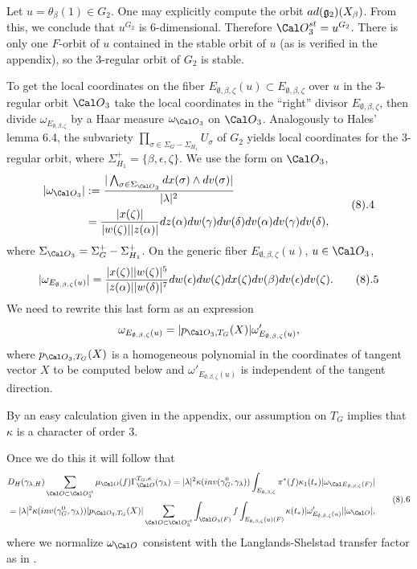 Let $u=\theta_{\beta}(1)\in G_2$.
One may explicitly compute the orbit $ad({\frak g}_2)(X_\beta)$.
From this, we conclude that $u^{G_2}$
is 6-dimensional. Therefore ${\Cal O}_3^{st}=u^{G_2}$. 
There is only one $F$-orbit of $u$ contained in the stable orbit of $u$
(as is verified in the appendix), so the $3$-regular orbit
of $G_2$ is stable.
\par
To get the local coordinates on the fiber 
$E_{\emptyset,\beta,\zeta}(u)\subset E_{\emptyset,\beta,\zeta}$ over
$u$ in the 3-regular orbit ${\Cal O}_3$ take the local
coordinates in the ``right'' divisor $E_{\emptyset,\beta,\zeta}$, 
then divide $\omega_{E_{\emptyset,\beta,\zeta}}$ by a Haar measure
$\omega_{{\Cal O}_3}$ on ${\Cal O}_3$.
Analogously to Hales' lemma 6.4,
the subvariety $\prod_{\sigma\in \Sigma_G-\Sigma_{H_1}}U_\sigma$
of $G_2$ yields local coordinates for the $3$-regular orbit,
where $\Sigma_{H_1}^+=\{\beta,\epsilon,\zeta\}$.
We use the form on ${\Cal O}_3$,
$$
\split
|\omega_{{\Cal O}_3}|
&:={|\bigwedge_{\sigma\in \Sigma_{{\Cal O}_3}}dx(\sigma)\wedge dv(\sigma)|
\over |\lambda|^2}\\
&={|x(\zeta)|\over |w(\zeta)||z(\alpha)|}
dz(\alpha)dw(\gamma)dw(\delta)dv(\alpha)dv(\gamma)dv(\delta),
\endsplit
\tag 8.4
$$
where $\Sigma_{{\Cal O}_3}=\Sigma_{G}^+ -\Sigma_{H_1}^+$.
On the generic fiber $E_{\emptyset,\beta,\zeta}(u)$, $u\in {\Cal O}_3$,
$$
|\omega_{E_{\emptyset,\beta,\zeta}(u)}|=
{{|x(\zeta)||w(\zeta)|^5}\over{|z(\alpha)||w(\delta)|^7}}
dw(\epsilon)dw(\zeta)dx(\zeta)dv(\beta)dv(\epsilon)dv(\zeta). 
\tag 8.5
$$
We need to rewrite this last form as an expression
$$
\omega_{E_{\emptyset,\beta,\zeta}(u)}=
|p_{{\Cal O}_3,T_G}(X)|\omega'_{E_{\emptyset,\beta,\zeta}(u)},
$$
where $p_{{\Cal O}_3,T_G}(X)$ is a homogeneous polynomial in the coordinates
of tangent vector $X$ to be computed below
and $\omega'_{E_{\emptyset,\beta,\zeta}(u)}$
is independent of the tangent direction. 
\par
By an easy calculation given in the appendix,
our assumption on $T_G$ implies that $\kappa$ is a character
of order $3$.
\par
Once we do this it will follow that
$$
\split
&D_H(\gamma_{\lambda,H})\sum_{{\Cal O}\subset {\Cal O}_3^{st}}
\mu_{\Cal O}(f)\Gamma_{\Cal O}^{T_G,\kappa}(\gamma_\lambda)
=|\lambda|^2\kappa(inv(\gamma_G^0,\gamma_\lambda))
\int_{E_{\emptyset,\beta,\zeta}}
\pi^*(f)\kappa_1(t_*)|\omega_{{\Cal E}_{\emptyset,\beta,\zeta}(F)}|\\
&=|\lambda|^2\kappa(inv(\gamma_G^0,\gamma_\lambda))
|p_{{\Cal O}_3,T_G}(X)|
\sum_{{\Cal O}\subset {\Cal O}_3^{st}}\int_{{\Cal O}_3(F)}f
\int_{E_{\emptyset,\beta,\zeta}(u)(F)}\kappa(t_*)
|\omega'_{E_{\emptyset,\beta,\zeta}(u)}||\omega_{\Cal O}|,
\endsplit
\tag 8.6
$$
where we normalize $\omega_{{\Cal O}}$ consistent with the
Langlands-Shelstad transfer factor as in \cite{H2}. 

